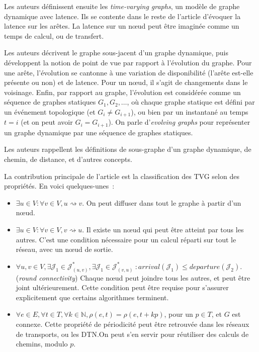 \documentclass[12pt,a4paper]{article}
\begin{document}
Les auteurs définissent ensuite les \textit{time-varying graphs}, un
modèle de graphe dynamique avec latence. Ils se contente dans le reste
de l'article d'évoquer la latence sur les arêtes. La latence sur un
nœud peut être imaginée comme un temps de calcul, ou de transfert.

Les auteurs décrivent le graphe sous-jacent d'un graphe dynamique,
puis développent la notion de point de vue par rapport à l'évolution
du graphe. Pour une arête, l'évolution se cantonne à une variation de
disponibilité (l'arête est-elle présente ou non) et de latence. Pour
un nœud, il s'agit de changements dans le voisinage. Enfin, par
rapport au graphe, l'évolution est considérée comme un séquence de
graphes statiques \(G_1, G_2, \dots\), où chaque graphe statique est
défini par un événement topologique (et \(G_i \neq G_{i+1}\)), ou bien
par un instantané au temps \(t = i\) (et on peut avoir
\(G_i = G_{i+1}\)). On parle d'\textit{evolving graphs} pour
représenter un graphe dynamique par une séquence de graphes statiques.

Les auteurs rappellent les définitions de sous-graphe d'un graphe
dynamique, de chemin, de distance, et d'autres concepts.

La contribution principale de l'article est la classification des TVG
selon des propriétés. En voici quelques-unes~:

\begin{itemize}
\item \(\exists u \in V : \forall v \in V, u \rightsquigarrow v\). On
  peut diffuser dans tout le graphe à partir d'un nœud.
\item \(\exists u \in V : \forall v \in V, v \rightsquigarrow u\). Il
  existe un nœud qui peut être atteint par tous les autres. C'est une
  condition nécessaire pour un calcul réparti sur tout le réseau, avec
  un nœud de sortie.
\item
  \(\forall u, v \in V, \exists \mathcal{J}_1 \in
  \mathcal{J}^*_{(u,v)}, \exists \mathcal{J}_1 \in
  \mathcal{J}^*_{(v,u)}~: arrival(\mathcal{J}_1) \leq
  departure(\mathcal{J}_2)\). (\textit{round connectivity}) Chaque
  nœud peut joindre tous les autres, et peut être joint
  ultérieurement. Cette condition peut être requise pour s'assurer
  explicitement que certains algorithmes terminent.
\item
  \(\forall e \in E, \forall t \in T, \forall k \in \mathbb{N},
  \rho(e, t) = \rho(e, t + kp)\), pour un \(p \in T\), et \(G\) est
  connexe. Cette propriété de périodicité peut être retrouvée dans les
  réseaux de transports, ou les DTN.\@ On peut s'en servir pour
  réutiliser des calculs de chemins, modulo \(p\).
\end{itemize}
\end{document}

